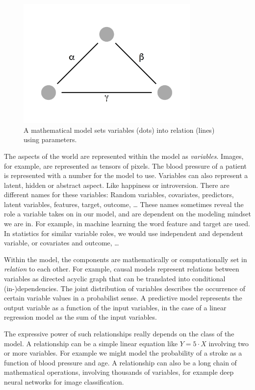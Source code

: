 \documentclass[
  10pt,
]{scrbook}
\begin{document}
\begin{figure}

{\centering \includegraphics[width=0.8\textwidth]{figures/model-1} 

}

\caption{A mathematical model sets variables (dots) into relation (lines) using parameters.}\label{fig:model}
\end{figure}

The aspects of the world are represented within the model as \emph{variables}.
Images, for example, are represented as tensors of pixels.
The blood pressure of a patient is represented with a number for the model to use.
Variables can also represent a latent, hidden or abstract aspect.
Like happiness or introversion.
There are different names for these variables:
Random variables, covariates, predictors, latent variables, features, target, outcome, \ldots{}
These names sometimes reveal the role a variable takes on in our model, and are dependent on the modeling mindset we are in.
For example, in machine learning the word feature and target are used.
In statistics for similar variable roles, we would use independent and dependent variable, or covariates and outcome, \ldots{}

Within the model, the components are mathematically or computationally set in \emph{relation} to each other.
For example, causal models represent relations between variables as directed acyclic graph that can be translated into conditional (in-)dependencies.
The joint distribution of variables describes the occurrence of certain variable values in a probabilist sense.
A predictive model represents the output variable as a function of the input variables, in the case of a linear regression model as the sum of the input variables.

The expressive power of such relationships really depends on the class of the model.
A relationship can be a simple linear equation like \(Y = 5 \cdot X\) involving two or more variables.
For example we might model the probability of a stroke as a function of blood pressure and age.
A relationship can also be a long chain of mathematical operations, involving thousands of variables, for example deep neural networks for image classification.
\end{document}
